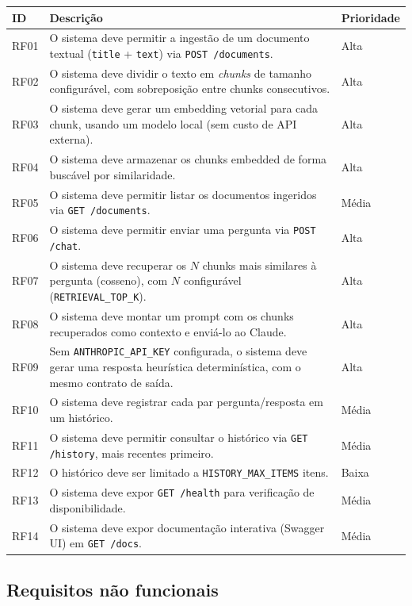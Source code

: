 \documentclass[11pt,a4paper]{article}
\begin{document}
\begin{longtable}{p{1.5cm}p{9.5cm}p{2cm}}
\toprule
\textbf{ID} & \textbf{Descrição} & \textbf{Prioridade} \\
\midrule
\endhead
RF01 & O sistema deve permitir a ingestão de um documento textual (\texttt{title} +
        \texttt{text}) via \texttt{POST /documents}. & Alta \\
RF02 & O sistema deve dividir o texto em \emph{chunks} de tamanho configurável, com
        sobreposição entre chunks consecutivos. & Alta \\
RF03 & O sistema deve gerar um embedding vetorial para cada chunk, usando um modelo
        local (sem custo de API externa). & Alta \\
RF04 & O sistema deve armazenar os chunks embedded de forma buscável por
        similaridade. & Alta \\
RF05 & O sistema deve permitir listar os documentos ingeridos via
        \texttt{GET /documents}. & Média \\
RF06 & O sistema deve permitir enviar uma pergunta via \texttt{POST /chat}. & Alta \\
RF07 & O sistema deve recuperar os $N$ chunks mais similares à pergunta (cosseno),
        com $N$ configurável (\texttt{RETRIEVAL\_TOP\_K}). & Alta \\
RF08 & O sistema deve montar um prompt com os chunks recuperados como contexto e
        enviá-lo ao Claude. & Alta \\
RF09 & Sem \texttt{ANTHROPIC\_API\_KEY} configurada, o sistema deve gerar uma
        resposta heurística determinística, com o mesmo contrato de saída. & Alta \\
RF10 & O sistema deve registrar cada par pergunta/resposta em um histórico. & Média \\
RF11 & O sistema deve permitir consultar o histórico via \texttt{GET /history},
        mais recentes primeiro. & Média \\
RF12 & O histórico deve ser limitado a \texttt{HISTORY\_MAX\_ITEMS} itens. & Baixa \\
RF13 & O sistema deve expor \texttt{GET /health} para verificação de
        disponibilidade. & Média \\
RF14 & O sistema deve expor documentação interativa (Swagger UI) em
        \texttt{GET /docs}. & Média \\
\bottomrule
\end{longtable}

\subsection{Requisitos não funcionais}
\end{document}
